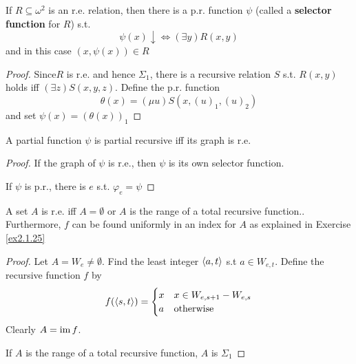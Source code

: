 \documentclass[11pt]{article}
\begin{document}
\begin{theorem}
\label{thm2.1.6}
If \(R\subseteq\omega^2\) is an r.e. relation, then there is a p.r. function
\(\psi\) (called a \textbf{selector function} for \(R\)) s.t.
\begin{equation*}
\psi(x)\downarrow\Leftrightarrow(\exists y)R(x,y)
\end{equation*}
and in this case \((x,\psi(x))\in R\)
\end{theorem}

\begin{proof}
Since\(R\) is r.e. and hence \(\Sigma_1\), there is a recursive relation
\(S\) s.t. \(R(x,y)\) holds iff \((\exists z)S(x,y,z)\). Define the p.r.
function
\begin{equation*}
\theta(x)=(\mu u)S(x,(u)_1,(u)_2)
\end{equation*}
and set \(\psi(x)=(\theta(x))_1\)
\end{proof}

\begin{theorem}
\label{thm2.1.7}
A partial function \(\psi\) is partial recursive iff its graph is r.e.
\end{theorem}

\begin{proof}
If the graph of \(\psi\) is r.e., then \(\psi\) is its own selector function.

If \(\psi\) is p.r., there is \(e\) s.t. \(\varphi_e=\psi\)
\end{proof}

\begin{theorem}
A set \(A\) is r.e. iff \(A=\emptyset\) or \(A\) is the range of a total
recursive function.. Furthermore, \(f\) can be found uniformly in an index
for \(A\) as explained in Exercise \ref{ex2.1.25}
\end{theorem}

\begin{proof}
Let \(A=W_e\neq\emptyset\). Find the least integer \(\langle a,t\rangle\) s.t
\(a\in W_{e,t}\). Define the recursive function \(f\) by
\begin{equation*}
f(\langle s,t\rangle)=
\begin{cases}
x&x\in W_{e,s+1}-W_{e,s}\\
a&\text{otherwise}
\end{cases}
\end{equation*}
Clearly \(A=\operatorname{im} f\).

If \(A\) is the range of a total recursive function, \(A\) is \(\Sigma_1\)
\end{proof}
\end{document}
